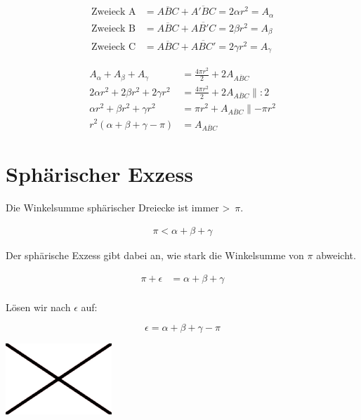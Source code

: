 \begin{refsection}
\begin{align*}
\text{Zweieck A}
&=
\overline{ABC} + \overline{A'BC} = 2 \alpha r^{ 2 } = A_{ \alpha }\\
\text{Zweieck B}
&=
\overline{ABC} + \overline{AB'C} = 2 \beta r^{ 2 } = A_{ \beta }\\
\text{Zweieck C}
&=
\overline{ABC} + \overline{ABC'} = 2 \gamma r^{ 2 } = A_{ \gamma }
\end{align*}

\begin{align*}
A_{ \alpha } + A_{ \beta } + A_{ \gamma } &= \frac{ 4\pi r^{ 2 } }{ 2 } + 2A_{ \overline{ ABC }} \\
2\alpha r^{ 2 } + 2\beta r^{ 2 } + 2\gamma r^{ 2 } &= \frac{ 4\pi r^{ 2 } }{ 2 } + 2A_{ \overline{ ABC }} \parallel:2\\
\alpha r^{ 2 } + \beta r^{ 2 } + \gamma r^{ 2 } &= \pi r^{ 2 } + A_{ \overline{ ABC }} \parallel-\pi r^{ 2 }\\
r^{ 2 }\left(\alpha + \beta + \gamma - \pi\right) &= A_{ \overline{ ABC }}
\end{align*}


\section{Sphärischer Exzess}
Die Winkelsumme sphärischer Dreiecke ist immer \textgreater \,  $\pi$.

\begin{align*}
\pi < \alpha + \beta + \gamma
\end{align*}

Der sphärische Exzess gibt dabei an, wie stark die Winkelsumme von $\pi$ abweicht.

\begin{align*}
\pi + \epsilon &= \alpha + \beta + \gamma \\
\end{align*}

Lösen wir nach $\epsilon$ auf:

\begin{equation}
\epsilon = \alpha + \beta + \gamma - \pi
\end{equation}

\begin{center}
        \includegraphics[width=0.3\textwidth]{kugel/Beispielbild.jpg}
\end{center}


\end{refsection}
